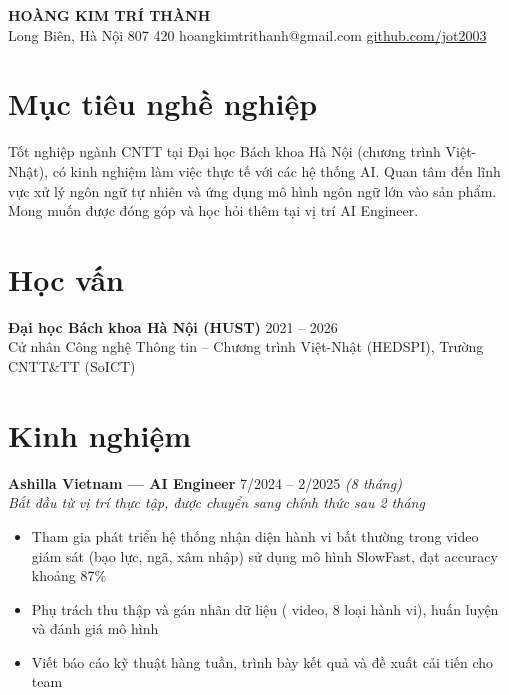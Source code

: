 \documentclass[a4paper,10pt]{article}
\begin{document}
\begin{center}
{\LARGE\bfseries HOÀNG KIM TRÍ THÀNH}\\[4pt]
{\small Long Biên, Hà Nội \enspace\textbar{} 807 420 \enspace\textbar\enspace hoangkimtrithanh@gmail.com \enspace\textbar\enspace \href{https://github.com/jot2003}{github.com/jot2003}}
\end{center}

\vspace{-2pt}

\section{Mục tiêu nghề nghiệp}
Tốt nghiệp ngành CNTT tại Đại học Bách khoa Hà Nội (chương trình Việt-Nhật), có kinh nghiệm làm việc thực tế với các hệ thống AI. Quan tâm đến lĩnh vực xử lý ngôn ngữ tự nhiên và ứng dụng mô hình ngôn ngữ lớn vào sản phẩm. Mong muốn được đóng góp và học hỏi thêm tại vị trí AI Engineer.

\section{Học vấn}
\textbf{Đại học Bách khoa Hà Nội (HUST)} \hfill 2021 -- 2026\\
Cử nhân Công nghệ Thông tin -- Chương trình Việt-Nhật (HEDSPI), Trường CNTT\&TT (SoICT)

\section{Kinh nghiệm}

\textbf{Ashilla Vietnam --- AI Engineer} \hfill 7/2024 -- 2/2025 \textit{(8 tháng)}\\
\textit{Bắt đầu từ vị trí thực tập, được chuyển sang chính thức sau 2 tháng}
\begin{itemize}
  \item Tham gia phát triển hệ thống nhận diện hành vi bất thường trong video giám sát (bạo lực, ngã, xâm nhập) sử dụng mô hình SlowFast, đạt accuracy khoảng 87\%
  \item Phụ trách thu thập và gán nhãn dữ liệu ( video, 8 loại hành vi), huấn luyện và đánh giá mô hình
  \item Viết báo cáo kỹ thuật hàng tuần, trình bày kết quả và đề xuất cải tiến cho team
\end{itemize}
\end{document}
